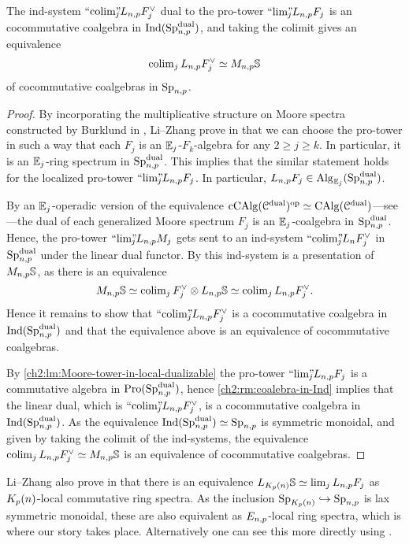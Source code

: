 \begin{lemma}
    \label{ch2:lm:coalgebra-ind-presentation-of-monochromatic-sphere}
    The ind-system $``\!\operatorname{colim}\!"_{\hspace{-5pt} j} L_{n,p} F_j^\vee$ dual to the pro-tower $``\!\lim\!"_{\hspace{-5pt} j} L_{n,p} F_j$ is an cocommutative coalgebra in $\operatorname{Ind}(\mathrm{Sp}_{n,p}^{\mathrm{dual}})$, and taking the colimit gives an equivalence 
    \[\operatorname{colim}_j L_{n,p} F_j^\vee \simeq M_{n,p}\mathbb{S}\] 
    of cocommutative coalgebras in $\mathrm{Sp}_{n,p}$. 
\end{lemma}
\begin{proof}
    By incorporating the multiplicative structure on Moore spectra constructed by Burklund in \cite{burklund_2022}, Li--Zhang prove in \cite[2.1.4]{li-zhang_2023} that we can choose the pro-tower in such a way that each $F_j$ is an $\mathbb{E}_j$-$F_k$-algebra for any $2\geq j \geq k$. In particular, it is an $\mathbb{E}_j$-ring spectrum in $\mathrm{Sp}_{n,p}^{\mathrm{dual}}$. This implies that the similar statement holds for the localized pro-tower $``\!\lim\!"_{\hspace{-5pt} j} L_{n,p} F_j$. In particular, $L_{n,p} F_j \in \operatorname{Alg}_{\mathbb{E}_j}(\mathrm{Sp}_{n,p}^{\mathrm{dual}})$. 
    
    By an $\mathbb{E}_j$-operadic version of the equivalence $\operatorname{cCAlg}(\EuScript{C}^{\mathrm{dual}})^{\mathrm{op}}\simeq \operatorname{CAlg}(\EuScript{C}^{\mathrm{dual}})$---see \cite[3.5]{peroux_2022}---the dual of each generalized Moore spectrum $F_j$ is an $\mathbb{E}_j$-coalgebra in $\mathrm{Sp}_{n,p}^{\mathrm{dual}}$. Hence, the pro-tower $``\!\lim\!"_{\hspace{-5pt} j} L_{n,p} M_j$ gets sent to an ind-system $``\!\operatorname{colim}\!"_{\hspace{-5pt} j} L_n F_j^\vee$ in $\mathrm{Sp}_{n,p}^{\mathrm{dual}}$ under the linear dual functor. By \cite[7.10(c)]{hovey-strickland_99} this ind-system is a presentation of $M_{n,p}\mathbb{S}$, as there is an equivalence 
    \[M_{n,p} \mathbb{S} \simeq \operatorname{colim}_j F_j^\vee \otimes L_{n,p}\mathbb{S} \simeq \operatorname{colim}_j L_{n,p} F_j^\vee.\]
    Hence it remains to show that $``\!\operatorname{colim}\!"_{\hspace{-5pt} j} L_{n,p} F_j^\vee$ is a cocommutative coalgebra in $\operatorname{Ind}(\mathrm{Sp}_{n,p}^{\mathrm{dual}})$ and that the equivalence above is an equivalence of cocommutative coalgebras. 

    By \cref{ch2:lm:Moore-tower-in-local-dualizable} the pro-tower $``\!\lim\!"_{\hspace{-5pt} j} L_{n,p} F_j$ is a commutative algebra in $\operatorname{Pro}(\mathrm{Sp}_{n,p}^{\mathrm{dual}})$, hence \cref{ch2:rm:coalebra-in-Ind} implies that the linear dual, which is $``\!\operatorname{colim}\!"_{\hspace{-5pt} j} L_{n,p} F_j^\vee$, is a cocommutative coalgebra in $\operatorname{Ind}(\mathrm{Sp}_{n,p}^{\mathrm{dual}})$. As the equivalence $\operatorname{Ind}(\mathrm{Sp}_{n,p}^{\mathrm{dual}})\simeq \mathrm{Sp}_{n,p}$ is symmetric monoidal, and given by taking the colimit of the ind-systems, the equivalence $\operatorname{colim}_j L_{n,p} F_j^\vee \simeq M_{n,p} \mathbb{S}$ is an equivalence of cocommutative coalgebras.  
\end{proof}

\begin{remark}
    Li--Zhang also prove in \cite[2.1.5]{li-zhang_2023} that there is an equivalence $L_{K_p(n)}\mathbb{S} \simeq \lim_j L_{n,p} F_j$ as ${K_p(n)}$-local commutative ring spectra. As the inclusion $\mathrm{Sp}_{{K_p(n)}}\hookrightarrow \mathrm{Sp}_{n,p}$ is lax symmetric monoidal, these are also equivalent as $E_{n,p}$-local ring spectra, which is where our story takes place. Alternatively one can see this more directly using \cite[2.1.6]{li-zhang_2023}. 
\end{remark}

